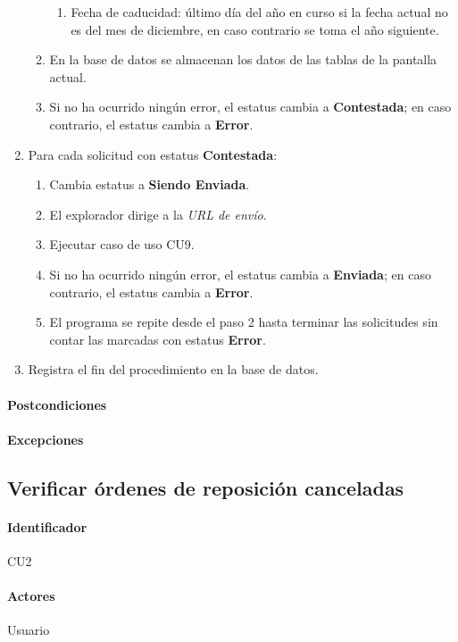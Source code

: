 \begin{enumerate}
\begin{enumerate}
\begin{enumerate}
      \item Fecha de caducidad: último día del año en curso si la fecha actual no es del mes de diciembre, en caso contrario se toma el año siguiente.
    \end{enumerate}
    \item En la base de datos se almacenan los datos de las tablas de la pantalla actual.
    \item Si no ha ocurrido ningún error, el estatus cambia a \textbf{Contestada}; en caso contrario, el estatus cambia a \textbf{Error}.
  \end{enumerate}
  \item Para cada solicitud con estatus \textbf{Contestada}:
  \begin{enumerate}
  \item Cambia estatus a \textbf{Siendo Enviada}.
  \item El explorador dirige a la \textit{URL de envío}.
  \item Ejecutar caso de uso CU9.
  \item Si no ha ocurrido ningún error, el estatus cambia a \textbf{Enviada}; en caso contrario, el estatus cambia a \textbf{Error}.
  \item El programa se repite desde el paso 2 hasta terminar las solicitudes sin contar las marcadas con estatus \textbf{Error}.
  \end{enumerate}
  \item Registra el fin del procedimiento en la base de datos.
\end{enumerate}
\paragraph{Postcondiciones}
\paragraph{Excepciones}


\subsection{Verificar órdenes de reposición canceladas}
\paragraph{Identificador}
CU2
\paragraph{Actores}
Usuario
